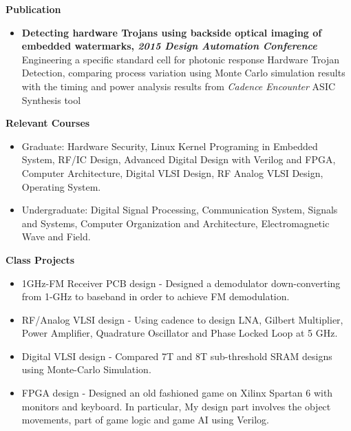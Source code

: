 \documentclass[]{article}
\begin{document}
\noindent \textbf{Publication}
\vspace{-0.15cm}
\begin{itemize}
    \item \textbf{Detecting hardware Trojans using backside optical imaging of
    embedded watermarks, \textit{2015 Design Automation Conference}} Engineering
    a specific standard cell for photonic response Hardware Trojan Detection,
    comparing process variation using Monte Carlo simulation results with the
    timing and power analysis results from \textit{Cadence Encounter} ASIC
    Synthesis tool
\end{itemize}

\noindent \textbf{Relevant Courses}
\begin{itemize}
\item Graduate:
                    Hardware Security, Linux Kernel Programing in Embedded System, RF/IC Design,
                    Advanced Digital Design with Verilog and FPGA, Computer
                    Architecture, Digital VLSI Design, RF Analog VLSI Design,
                    Operating System.
\item Undergraduate:
                    Digital Signal Processing, Communication System, Signals
                    and Systems, Computer Organization and 
                    Architecture, Electromagnetic Wave and Field. 
\end{itemize}


\noindent \textbf{Class Projects}
\begin{itemize}

\item 1GHz-FM Receiver PCB design -
Designed a demodulator down-converting from 1-GHz to baseband in order to
achieve FM demodulation.

\item RF/Analog VLSI design -
Using cadence to design LNA, Gilbert Multiplier, Power Amplifier, Quadrature
Oscillator and Phase Locked Loop at 5 GHz.

\item Digital VLSI design - 
Compared 7T and 8T sub-threshold SRAM designs using Monte-Carlo Simulation.

\item FPGA design - 
Designed an old fashioned game on Xilinx Spartan 6 with monitors and keyboard.
In particular, My design part involves the object movements, part of game logic
and game AI using Verilog.




\end{itemize}
\end{document}
